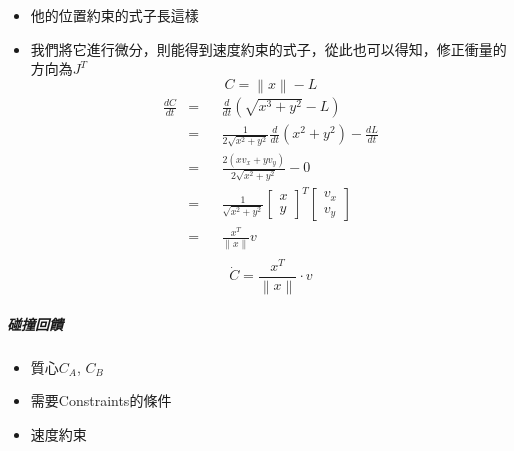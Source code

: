 \begin{itemize}
    \item{他的位置約束的式子長這樣}
    \item{我們將它進行微分，則能得到速度約束的式子，從此也可以得知，修正衝量的方向為$J^{T}$}
        \begin{equation} C = \left \|x  \right \| - L \end{equation}
        \begin{equation}
            \begin{aligned}
            \frac{dC}{dt}&=&& \frac{d}{dt}\left(\sqrt{x^3+y^2}-L\right) \\
                         &=&& \frac{1}{2\sqrt{x^2+y^2}}\frac{d}{dt}(x^2+y^2)-\frac{dL}{dt}\\
                         &=&& \frac{2(xv_x+yv_y)}{2\sqrt{x^2+y^2}}-0\\
                         &=&& \frac{1}{\sqrt{x^2+y^2}} \begin{bmatrix}x\\y\end{bmatrix}^T \begin{bmatrix}v_x\\v_y\end{bmatrix} \\
                         &=&& \frac{x^T}{\parallel x\parallel}v \\
            \end{aligned}
        \end{equation}
        \begin{equation} \dot{C} = \frac{x^{T}}{\left \|x  \right \|} \cdot v \end{equation}
\end{itemize}

\subparagraph{碰撞回饋}

\begin{itemize}
\item{質心$C_A$, $C_B$}
\end{itemize}

\begin{itemize}
    \item{需要Constraints的條件}
    \item{速度約束}
\end{itemize}

